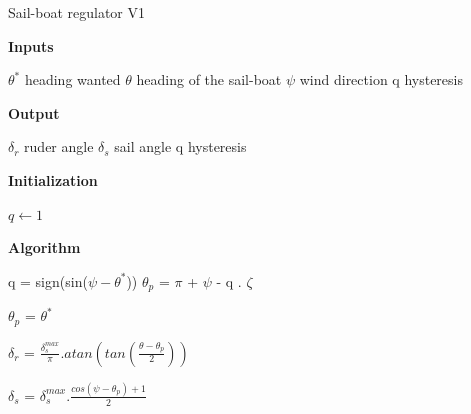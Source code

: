 \begin{algorithm}[H]
  \caption{Sail-boat regulator V1 }
  \label{alg:MYALG}
  \textbf{Inputs}%
  \begin{algorithmic}[1]
    \STATE $\theta^*$ heading wanted
    \STATE $\theta$ heading of the sail-boat
    \STATE $\psi$ wind direction
    \STATE q hysteresis
  \end{algorithmic}
  \bigskip

  \textbf{Output}%
  \begin{algorithmic}[1]
    \STATE $\delta_r$ ruder angle
    \STATE $\delta_s$ sail angle
    \STATE q hysteresis
  \end{algorithmic}
  \bigskip
  
  \textbf{Initialization}%
  \begin{algorithmic}[1]
   	\STATE $q\gets 1$
  \end{algorithmic}
  
  
  \textbf{Algorithm}
  \begin{algorithmic}[1]
	 		\STATE q = sign(sin($\psi-\theta^*$))
     	  	\STATE $\theta_p$ = $\pi$ + $\psi$ - q . $\zeta$
     	
		\ELSE
			\STATE $\theta_p$ = $\theta^*$
	 	\ENDIF
	 	
  \STATE $\delta_r$ = $\frac{\delta_s^{max}}{\pi} . atan(tan(\frac{\theta-\theta_p}{2}))$
  
  \STATE $\delta_s$ = $\delta_s^{max} . \frac{cos(\psi-\theta_p)+1}{2}$
	
  \end{algorithmic}
\end{algorithm}




